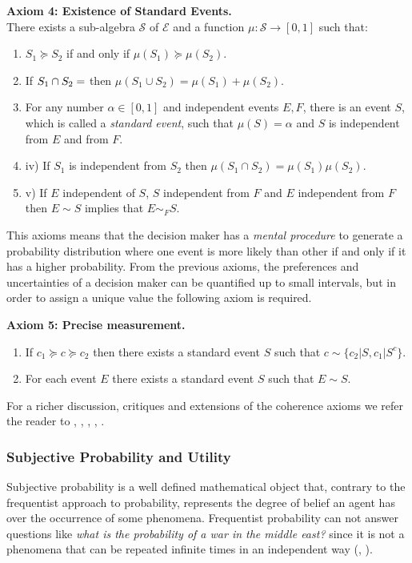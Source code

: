 \documentclass[english,letterpaper,12pt,final]{article}
\theoremstyle{definition}
\begin{document}
	\textbf{Axiom 4: Existence of Standard Events.}\\
	There exists a sub-algebra $\mathcal{S}$ of $\mathcal{E}$ and a function $\mu : \mathcal{S} \to [0,1]$ such that:
	\begin{enumerate}[label=(\roman*)]
	\item $S_1 \succeq S_2$ if and only if $\mu(S_1) \succeq \mu(S_2)$.
	\item If $S_1 \cap S_2 = \empty$ then $\mu(S_1 \cup S_2) = \mu(S_1) + \mu(S_2)$.
	\item For any number $\alpha \in [0,1]$ and independent events $E,F$, there is an event $S$, which is called a \textit{standard event}, such that $\mu(S)=\alpha$ and $S$ is independent from $E$ and from $F$.
	\item iv) If $S_1$ is independent from $S_2$ then $\mu(S_1 \cap S_2)=\mu(S_1)\mu(S_2)$.
	\item v) If $E$ independent of $S$, $S$ independent from $F$ and $E$ independent from $F$ then $E \sim S$ implies that $E \sim_F S$.
	\end{enumerate}
	This axioms means that the decision maker has a \textit{mental procedure} to generate a probability distribution where one event is more likely than other if and only if it has a higher probability. From the previous axioms, the preferences and uncertainties of a decision maker can be quantified up to small intervals, but in order to assign a unique value the following axiom is required.
	
	\textbf{Axiom 5: Precise measurement.}
	\begin{enumerate}[label=(\roman*)]
	\item If $c_1 \succeq c \succeq c_2$ then there exists a standard event $S$ such that $c \sim \{ c_2 | S, c_1 | S^c \}$.
	\item For each event $E$ there exists a standard event $S$ such that $E \sim S$.
	\end{enumerate}
	
	For a richer discussion, critiques and extensions of the coherence axioms we refer the reader to \cite{bernardo2000bayesian}, \cite{binmore2008rational}, \cite{gilboa2009decision}, \cite{wakker2010prospect}, \cite{peterson2017introduction}.
	\subsubsection{Subjective Probability and Utility}
Subjective probability is a well defined mathematical object that, contrary to the frequentist approach to probability, represents the degree of belief an agent has over the occurrence of some phenomena. Frequentist probability can not answer questions like \textit{what is the probability of a war in the middle east?} since it is not a phenomena that can be repeated infinite times in an independent way (\cite{gilboa2009decision}, \cite{peterson2017introduction}).
\end{document}
